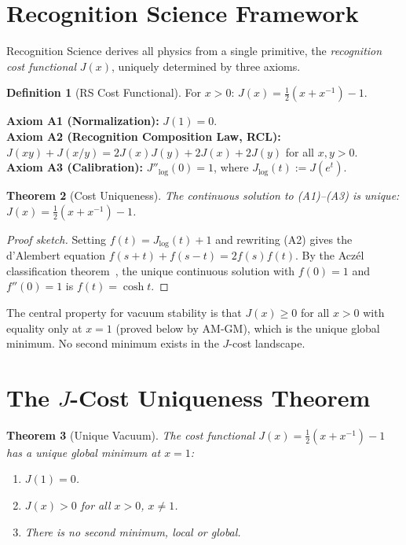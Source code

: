 \documentclass[12pt,a4paper]{article}
\newtheorem{theorem}{Theorem}[section]
\theoremstyle{definition}
\newtheorem{definition}[theorem]{Definition}
\theoremstyle{remark}
\begin{document}
\section{Recognition Science Framework}
\label{sec:framework}

Recognition Science derives all physics from a single primitive,
the \emph{recognition cost functional} $J(x)$, uniquely determined
by three axioms.

\begin{definition}[RS Cost Functional]
For $x > 0$: $J(x) = \tfrac{1}{2}(x + x^{-1}) - 1$.
\end{definition}

\noindent\textbf{Axiom A1 (Normalization):} $J(1) = 0$.\\
\textbf{Axiom A2 (Recognition Composition Law, RCL):}
$J(xy) + J(x/y) = 2J(x)J(y) + 2J(x) + 2J(y)$ for all $x, y > 0$.\\
\textbf{Axiom A3 (Calibration):} $J''_{\log}(0) = 1$, where
$J_{\log}(t) := J(e^t)$.

\begin{theorem}[Cost Uniqueness]
\label{thm:RS-unique}
The continuous solution to \textup{(A1)--(A3)} is unique:
$J(x) = \tfrac{1}{2}(x + x^{-1}) - 1$.
\end{theorem}

\begin{proof}[Proof sketch]
Setting $f(t) = J_{\log}(t) + 1$ and rewriting \textup{(A2)} gives the
d'Alembert equation $f(s+t) + f(s-t) = 2f(s)f(t)$.  By the Acz\'el
classification theorem~\cite{Aczel1966}, the unique continuous solution
with $f(0) = 1$ and $f''(0) = 1$ is $f(t) = \cosh t$.
\end{proof}

\noindent The central property for vacuum stability is that
$J(x) \geq 0$ for all $x > 0$ with equality only at $x = 1$
(proved below by AM-GM), which is the unique global minimum.
No second minimum exists in the $J$-cost landscape.

\section{The $J$-Cost Uniqueness Theorem}
\label{sec:uniqueness}

\begin{theorem}[Unique Vacuum]
\label{thm:unique}
The cost functional $J(x) = \tfrac{1}{2}(x + x^{-1}) - 1$ has
a unique global minimum at $x = 1$:
\begin{enumerate}[label=(\roman*)]
  \item $J(1) = 0$.
  \item $J(x) > 0$ for all $x > 0$, $x \neq 1$.
  \item There is no second minimum, local or global.
\end{enumerate}
\end{theorem}
\end{document}
